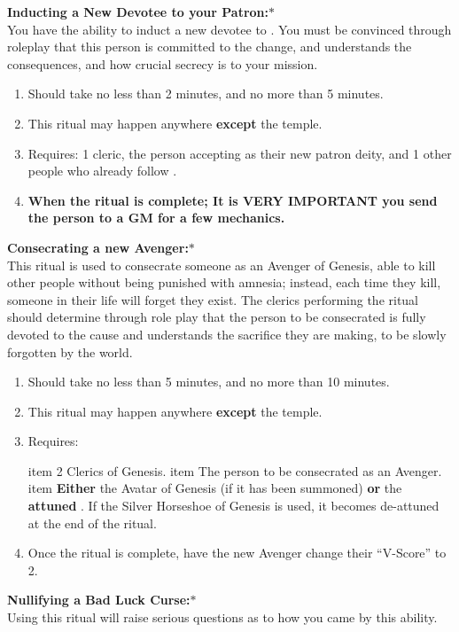 \documentclass[green]{GL2020}
\begin{document}
\textbf{Inducting a New Devotee to your Patron:}$*$\\
You have the ability to induct a new devotee to \cGenesis{}. You must be convinced through roleplay that this person is committed to the change, and understands the consequences, and how crucial secrecy is to your mission.
  \begin{enumerate}
    \item Should take no less than 2 minutes, and no more than 5 minutes.
    \item This ritual may happen anywhere \textbf{except} the temple.
    \item Requires: 1 cleric, the person accepting \cGenesis{} as their new patron deity, and 1 other people who already follow \cGenesis{}.
	\item \textbf{When the ritual is complete; It is VERY IMPORTANT you send the person to a GM for a few mechanics.}
  \end{enumerate}
  
\textbf{Consecrating a new Avenger:}$*$\\
This ritual is used to consecrate someone as an Avenger of Genesis, able to kill other people without being punished with amnesia; instead, each time they kill, someone in their life will forget they exist. The clerics performing the ritual should determine through role play that the person to be consecrated is fully devoted to the cause and understands the sacrifice they are making, to be slowly forgotten by the world.
  \begin{enumerate}
    \item Should take no less than 5 minutes, and no more than 10 minutes.
    \item This ritual may happen anywhere \textbf{except} the temple.
    \item Requires:
    \begin{enumerate}
    	item 2 Clerics of Genesis.
	item The person to be consecrated as an Avenger.
	item \textbf{Either} the Avatar of Genesis (if it has been summoned) \textbf{or} the \textbf{attuned} \iHorseshoe{}. If the Silver Horseshoe of Genesis is used, it becomes de-attuned at the end of the ritual.
    \end{enumerate}
	\item Once the ritual is complete, have the new Avenger change their ``V-Score'' to 2.
  \end{enumerate}
   
\textbf{Nullifying a Bad Luck Curse:}$*$\\
Using this ritual will raise serious questions as to how you came by this ability.
\end{document}
